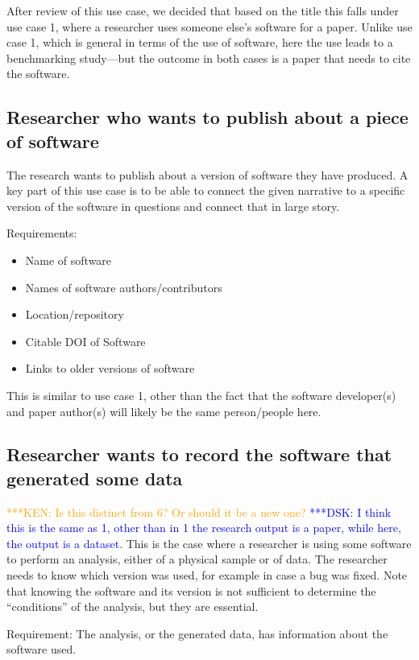 \documentclass[12pt, oneside]{amsart}
\newcommand{\katznote}[1]{ {\textcolor{blue} { ***DSK: #1 }}} %
\newcommand{\niemnote}[1]{ {\textcolor{orange} { ***KEN: #1 }}} %
\begin{document}
After review of this use case, we decided that based on the title this falls under
use case 1, where a researcher uses someone else's software for a paper.
Unlike use case 1, which is general in terms of the use of software, here the
use leads to a benchmarking study---but the outcome in both cases is a paper
that needs to cite the software.

\subsection*{Researcher who wants to publish about a piece of software}

The research wants to publish about a version of software they have produced.
A key part of this use case is to be able to connect the given narrative to a specific version of the software in questions and connect that in large story.

Requirements:
\begin{itemize}
\item Name of software
\item Names of software authors/contributors
\item Location/repository
\item Citable DOI of Software
\item Links to older versions of software
\end{itemize}

This is similar to use case 1, other than the fact that the software developer(s) and
paper author(s) will likely be the same person\slash people here.


\subsection*{Researcher wants to record the software that generated some data}

\niemnote{Is this distinct from 6? Or should it be a new one?} \katznote{I think this is the same as 1, other than in 1 the research output is a paper, while here, the output is a dataset.}
This is the case where a researcher is using some software to perform an analysis, either of a physical sample or of data.
The researcher needs to know which version was used, for example in case a bug was fixed.
Note that knowing the software and its version is not sufficient to determine the ``conditions'' of the analysis, but they are essential.

Requirement:
The analysis, or the generated data, has information about the software used.
\end{document}

